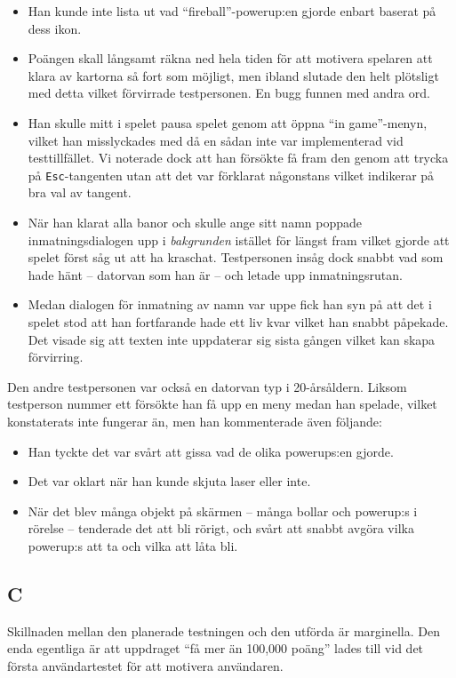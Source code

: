 \documentclass[11pt,a4paper]{article}
\begin{document}
\begin{itemize}
	\item Han kunde inte lista ut vad ``fireball''-powerup:en gjorde enbart baserat på dess ikon.
	\item Poängen skall långsamt räkna ned hela tiden för att motivera spelaren att klara av kartorna så fort som möjligt, men ibland slutade den helt plötsligt med detta vilket förvirrade testpersonen. En bugg funnen med andra ord.
	\item Han skulle mitt i spelet pausa spelet genom att öppna ``in game''-menyn, vilket han misslyckades med då en sådan inte var implementerad vid testtillfället. Vi noterade dock att han försökte få fram den genom att trycka på \texttt{Esc}-tangenten utan att det var förklarat någonstans vilket indikerar på bra val av tangent.
	\item När han klarat alla banor och skulle ange sitt namn poppade inmatningsdialogen upp i \emph{bakgrunden} istället för längst fram vilket gjorde att spelet först såg ut att ha kraschat. Testpersonen insåg dock snabbt vad som hade hänt -- datorvan som han är -- och letade upp inmatningsrutan.
	\item Medan dialogen för inmatning av namn var uppe fick han syn på att det i spelet stod att han fortfarande hade ett liv kvar vilket han snabbt påpekade. Det visade sig att texten inte uppdaterar sig sista gången vilket kan skapa förvirring.
\end{itemize}

Den andre testpersonen var också en datorvan typ i 20-årsåldern. Liksom testperson nummer ett försökte han få upp en meny medan han spelade, vilket konstaterats inte fungerar än, men han kommenterade även följande:

\begin{itemize}
	\item Han tyckte det var svårt att gissa vad de olika powerups:en gjorde.
	\item Det var oklart när han kunde skjuta laser eller inte.
	\item När det blev många objekt på skärmen -- många bollar och powerup:s i rörelse -- tenderade det att bli rörigt, och svårt att snabbt avgöra vilka powerup:s att ta och vilka att låta bli.
\end{itemize}

\subsection{C}
Skillnaden mellan den planerade testningen och den utförda är marginella. Den enda egentliga är att uppdraget ``få mer än 100,000 poäng'' lades till vid det första användartestet för att motivera användaren.
\end{document}
